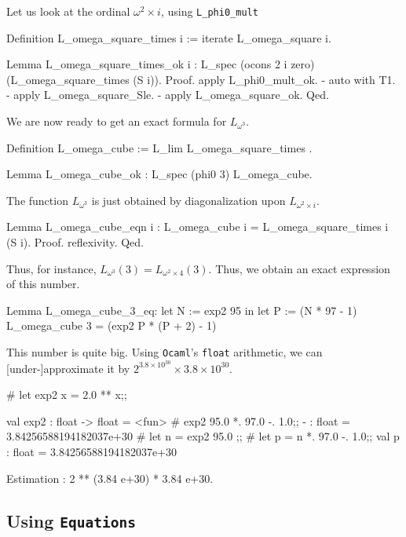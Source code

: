 Let us look 
at the ordinal $\omega^2\times i$, using \texttt{L\_phi0\_mult}

\begin{Coqsrc}
 Definition L_omega_square_times i :=  iterate L_omega_square i.

 Lemma L_omega_square_times_ok i : 
    L_spec (ocons 2 i zero) (L_omega_square_times (S i)).
 Proof.
  apply L_phi0_mult_ok.
  -  auto with T1.
  -  apply L_omega_square_Sle.
  -  apply L_omega_square_ok.
 Qed.
\end{Coqsrc}


We are now ready to get an exact formula for $L_{\omega^3}$. 
\begin{Coqsrc}
Definition L_omega_cube  := L_lim  L_omega_square_times .

Lemma L_omega_cube_ok : L_spec (phi0 3) L_omega_cube.
\end{Coqsrc}


The function  $L_{\omega^3}$  is just obtained by diagonalization upon $L_{\omega^2\times i}$.

\begin{Coqsrc}
Lemma L_omega_cube_eqn i : 
   L_omega_cube i = L_omega_square_times i (S i).
Proof. reflexivity. Qed.
\end{Coqsrc}

Thus, for instance, $L_{\omega^3}(3)=L_{\omega^2\times 4}(3)$.
Thus, we obtain an exact expression of this number.


\begin{Coqsrc}
Lemma L_omega_cube_3_eq:
   let N := exp2 95 in
   let P := (N * 97 - 1)%
   L_omega_cube 3  =  (exp2 P * (P + 2) - 1)%
\end{Coqsrc}


This number is quite big. Using \texttt{Ocaml}'s \texttt{float} arithmetic,
we can [under-]approximate it by $2^{3.8\times10^{30}}\times 3.8\times{10^{30}}$.

\begin{Coqsrc}
# let exp2 x = 2.0 ** x;;

val exp2 : float -> float = <fun>
#   exp2 95.0 *. 97.0 -. 1.0;;
- : float = 3.84256588194182037e+30
# let n = exp2 95.0 ;;
# let p = n *. 97.0 -. 1.0;;
val p : float = 3.84256588194182037e+30

Estimation :
2 ** (3.84 e+30) * 3.84 e+30.
\end{Coqsrc}


\subsection{Using \texttt{Equations}}
\label{sect:L-equations}

